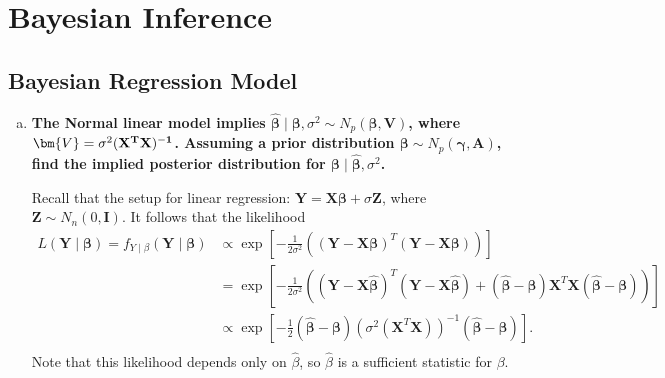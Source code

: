 \setcounter{section}{12}
\section{Bayesian Inference}

\subsection{Bayesian Regression Model}
\graphicspath{{notes/img}}

\newpage



\begin{enumerate}[a)]
\item \textbf{The Normal linear model implies $\hat{\bm{\beta}} \mid \bm{\beta}, \sigma^2 \sim N_p(\bm{\beta}, \bm{V})$, where
$\bm{V} = \sigma^2 (\bf{X}^T \bf{X})^{-1}$. Assuming a prior distribution $\bm{\beta} \sim N_p(\bm{\gamma}, \bm{A})$, find the implied
posterior distribution for $\bm{\beta} \mid \hat{\bm{\beta}}, \sigma^2$.}

Recall that the setup for linear regression: $\bm{Y} = \bm{X\beta} + \sigma \bm{Z}$, where $\bm{Z} \sim N_n(0, \bm{I})$. It follows that
the likelihood
\begin{align*}
    L(\bm{Y} \mid \bm{\beta}) = f_{Y \mid \beta}(\bm{Y} \mid \bm{\beta}) &\propto \exp \left[ -\frac{1}{2\sigma^2} \left( (\bm{Y} - \bm{X\beta})^T (\bm{Y} -\bm{X\beta}) \right) \right] \\
    &= \exp \left[ -\frac{1}{2\sigma^2} \left( (\bm{Y} - \bm{X}\hat{\bm{\beta}})^T(\bm{Y} - \bm{X\hat{\bm{\beta}}}) + (\hat{\bm{\beta}} - \bm{\beta})\bm{X}^T\bm{X}(\hat{\bm{\beta}} - \bm{\beta}) \right) \right] \\
    &\propto \exp \left[ -\frac{1}{2} (\hat{\bm{\beta}} - \bm{\beta})\left(\sigma^2(\bm{X}^T\bm{X})\right)^{-1}(\hat{\bm{\beta}} - \bm{\beta}) \right]. \\
\end{align*}
Note that this likelihood depends only on $\hat{\beta}$, so $\hat{\beta}$ is a sufficient statistic for $\beta$. \\


\end{enumerate}
